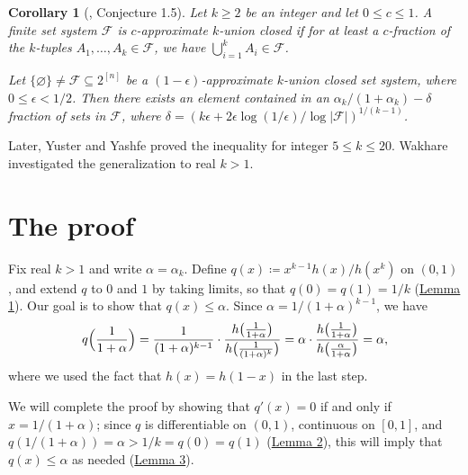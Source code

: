 \documentclass[twoside]{amsart} %
\newtheorem{corollary}{Corollary}
\begin{document}
\begin{corollary}[\cite{yus1}, Conjecture 1.5]
Let $k\ge2$ be an integer and let $0\le c\le1$.
A finite set system $\mathcal F$ is 
$c$-approximate $k$-union closed if for at least
a $c$-fraction of the $k$-tuples $A_1,\dots,A_k\in\mathcal F$,
we have $\bigcup_{i=1}^kA_i\in\mathcal F$.

Let $\{\varnothing\}\ne\mathcal F\subseteq2^{[n]}$ be a
$(1-\epsilon)$-approximate $k$-union closed set system,
where $0\le\epsilon<1/2$. Then there exists an element
contained in an $\alpha_k/(1+\alpha_k)-\delta$ fraction of sets in $\mathcal F$,
where $\delta=(k\epsilon+2\epsilon\log(1/\epsilon)/\log|\mathcal F|)^{1/(k-1)}$.
\end{corollary}

Later, Yuster and Yashfe \cite{yus2}
proved the inequality for integer $5\le k\le20$.
Wakhare \cite{wak} investigated the generalization to real $k>1$.

\section{The proof}
Fix real $k>1$ and write $\alpha=\alpha_k$. 
Define
$q(x)\coloneqq x^{k-1}h(x)/h(x^k)$ on $(0,1)$, 
and extend $q$ to $0$ and $1$ by taking limits,
so that $q(0)=q(1)=1/k$ (\hyperref[lemma:l1]{Lemma 1}).
Our goal is to show that $q(x)\le\alpha$.
Since $\alpha=1/(1+\alpha)^{k-1}$, we have 
$$q\Bigl({1\over1+\alpha}\Bigr)
={1\over(1+\alpha)^{k-1}}\cdot
{h\bigl({1\over1+\alpha}\bigr)\over 
h\bigl({1\over(1+\alpha)^k}\bigr)}
=\alpha\cdot{h\bigl({1\over1+\alpha}\bigr)\over 
h\bigl({\alpha\over1+\alpha}\bigr)}=\alpha,$$
where we used the fact that $h(x)=h(1-x)$ in the last step.

We will complete the proof by showing that $q'(x)=0$ if and only if $x=1/(1+\alpha)$;
since $q$ is differentiable on $(0,1)$, continuous on $[0,1]$, and $q(1/(1+\alpha))=\alpha>1/k=q(0)=q(1)$ (\hyperref[lemma:l2]{Lemma 2}), this will imply that $q(x)\le\alpha$ as needed (\hyperref[lemma:l3]{Lemma 3}).
\end{document}
